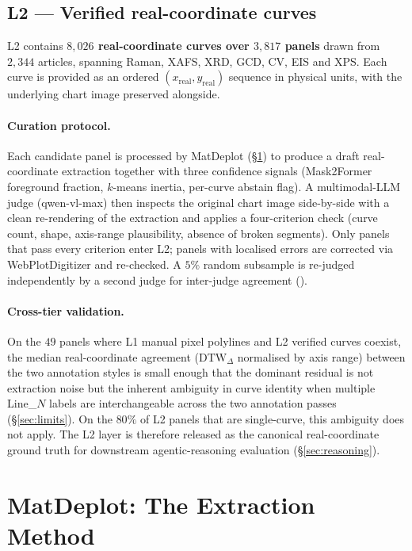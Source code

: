 \documentclass{article}
\begin{document}
\subsection{L2 --- Verified real-coordinate curves}\label{ssec:l2}
L2 contains \textbf{$8{,}026$ real-coordinate curves over $3{,}817$
panels} drawn from $2{,}344$ articles, spanning Raman, XAFS, XRD,
GCD, CV, EIS and XPS. Each curve is provided as an ordered
$(x_{\mathrm{real}}, y_{\mathrm{real}})$ sequence in physical units,
with the underlying chart image preserved alongside.

\paragraph{Curation protocol.}
Each candidate panel is processed by MatDeplot (\S\ref{sec:method})
to produce a draft real-coordinate extraction together with three
confidence signals (Mask2Former foreground fraction, $k$-means
inertia, per-curve abstain flag). A multimodal-LLM judge
(qwen-vl-max) then inspects the original chart image side-by-side
with a clean re-rendering of the extraction and applies a
four-criterion check (curve count, shape, axis-range plausibility,
absence of broken segments). Only panels that pass every criterion
enter L2; panels with localised errors are corrected via
WebPlotDigitizer and re-checked. A $5\%$ random subsample is
re-judged independently by a second judge for inter-judge
agreement ().

\paragraph{Cross-tier validation.}
On the $49$ panels where L1 manual pixel polylines and L2 verified
curves coexist, the median real-coordinate agreement
($\mathrm{DTW}_{\Delta}$ normalised by axis range) between the two
annotation styles is small enough that the dominant residual is
not extraction noise but the inherent ambiguity in curve identity
when multiple Line\_$N$ labels are interchangeable across the two
annotation passes (\S\ref{sec:limits}). On the $80\%$ of L2 panels
that are single-curve, this ambiguity does not apply. The L2 layer
is therefore released as the canonical real-coordinate ground
truth for downstream agentic-reasoning evaluation
(\S\ref{sec:reasoning}).

\section{MatDeplot: The Extraction Method}
\label{sec:method}
\end{document}
